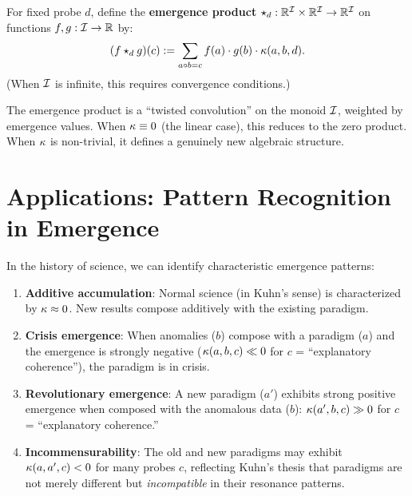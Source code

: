 \begin{definition}
For fixed probe $d$, define the \textbf{emergence product}
$\star_d : \mathbb{R}^{\mathcal{I}} \times \mathbb{R}^{\mathcal{I}} \to \mathbb{R}^{\mathcal{I}}$ on functions
$f, g : \mathcal{I} \to \mathbb{R}$ by:
\[
    (f \star_d g)(c) := \sum_{a \circ b = c} f(a) \cdot g(b)
    \cdot \kappa(a, b, d).
\]
(When $\mathcal{I}$ is infinite, this requires convergence conditions.)
\end{definition}

\begin{remark}
The emergence product is a ``twisted convolution'' on the monoid $\mathcal{I}$,
weighted by emergence values. When $\kappa \equiv 0$ (the linear case),
this reduces to the zero product. When $\kappa$ is non-trivial, it
defines a genuinely new algebraic structure.
\end{remark}

\section{Applications: Pattern Recognition in Emergence}

\begin{example}
In the history of science, we can identify characteristic emergence
patterns:
\begin{enumerate}
    \item \textbf{Additive accumulation}: Normal science (in Kuhn's
    sense) is characterized by $\kappa \approx 0$. New results compose
    additively with the existing paradigm.

    \item \textbf{Crisis emergence}: When anomalies ($b$) compose with
    a paradigm ($a$) and the emergence is strongly negative
    ($\kappa(a,b,c) \ll 0$ for $c$ = ``explanatory coherence''), the
    paradigm is in crisis.

    \item \textbf{Revolutionary emergence}: A new paradigm ($a'$)
    exhibits strong positive emergence when composed with the anomalous
    data ($b$): $\kappa(a', b, c) \gg 0$ for $c$ = ``explanatory
    coherence.''

    \item \textbf{Incommensurability}: The old and new paradigms may
    exhibit $\kappa(a, a', c) < 0$ for many probes $c$, reflecting
    Kuhn's thesis that paradigms are not merely different but
    \emph{incompatible} in their resonance patterns.
\end{enumerate}
\end{example}

